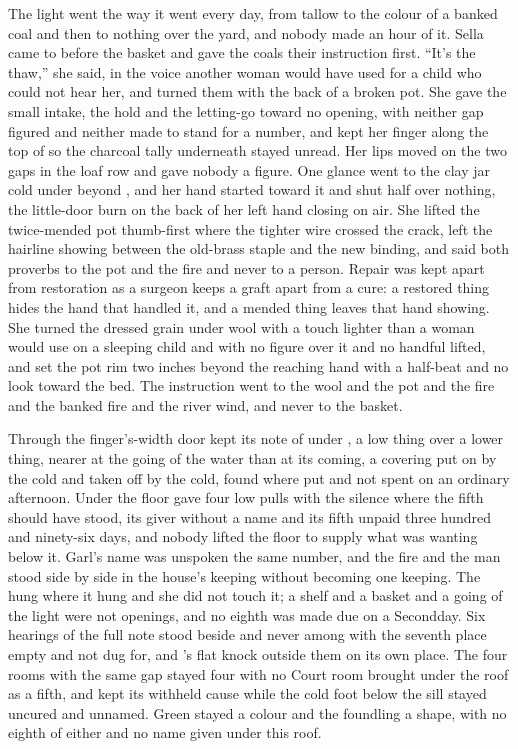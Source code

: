 The light went the way it went every day, from tallow to the colour of a banked coal and then to nothing over the yard, and nobody made an hour of it. Sella came to  before the basket and gave the coals their instruction first. “It's the thaw,” she said, in the voice another woman would have used for a child who could not hear her, and turned them with the back of a broken pot. She gave the small intake, the hold and the letting-go toward no opening, with neither gap figured and neither made to stand for a number, and kept her finger along the top of  so the charcoal tally underneath stayed unread. Her lips moved on the two gaps in the loaf row and gave nobody a figure. One glance went to the clay jar cold under  beyond , and her hand started toward it and shut half over nothing, the little-door burn on the back of her left hand closing on air. She lifted the twice-mended pot thumb-first where the tighter wire crossed the crack, left the hairline showing between the old-brass staple and the new binding, and said both proverbs to the pot and the fire and never to a person. Repair was kept apart from restoration as a surgeon keeps a graft apart from a cure: a restored thing hides the hand that handled it, and a mended thing leaves that hand showing. She turned the dressed grain under wool with a touch lighter than a woman would use on a sleeping child and with no figure over it and no handful lifted, and set the pot rim two inches beyond the reaching hand with a half-beat and no look toward the bed. The instruction went to the wool and the pot and the fire and the banked fire and the river wind, and never to the basket.

Through the finger's-width door  kept its note of  under , a low thing over a lower thing, nearer at the going of the water than at its coming, a covering put on by the cold and taken off by the cold, found where put and not spent on an ordinary afternoon. Under the floor  gave four low pulls with the silence where the fifth should have stood, its giver without a name and its fifth unpaid three hundred and ninety-six days, and nobody lifted the floor to supply what was wanting below it. Garl's name was unspoken the same number, and the fire and the man stood side by side in the house's keeping without becoming one keeping. The  hung where it hung and she did not touch it; a shelf and a basket and a going of the light were not openings, and no eighth was made due on a Secondday. Six hearings of the full note stood beside and never among with the seventh place empty and not dug for, and 's flat knock outside them on its own place. The four rooms with the same gap stayed four with no Court room brought under the roof as a fifth, and  kept its withheld cause while the cold foot below the sill stayed uncured and unnamed. Green stayed a colour and the foundling a shape, with no eighth of either and no name given under this roof.

